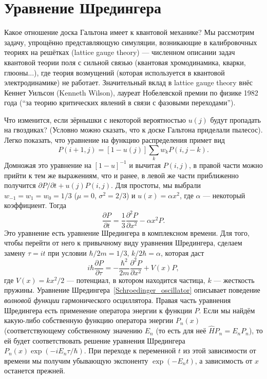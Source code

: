 \documentclass{book}
\begin{document}
\section{Уравнение Шредингера}

Какое отношение доска Гальтона имеет к квантовой механике? Мы рассмотрим задачу, упрощённо
представляющую симуляции, возникающие в калибровочных теориях на решётках (lattice gauge theory) ---
численном описании задач квантовой теории поля с сильной связью (квантовая хромодинамика, кварки,
глюоны...), где теория возмущений (которая используется в квантовой электродинамике) не работает.
Значительный вклад в lattice gauge theory внёс Кеннет Уильсон (Kenneth Wilson), лауреат Нобелевской
премии по физике 1982 года (``за теорию критических явлений в связи с фазовыми переходами'').

Что изменится, если зёрнышки с некоторой вероятностью $u(j)$ будут пропадать на гвоздиках? (Условно
можно сказать, что к доске Гальтона приделали пылесос).  Легко показать, что уравнение на функцию
распределения примет вид
\begin{equation}
    P(i+1, j) = [1 - u(j)]\sum_k w_k P(i, j - k).
\end{equation}
Домножая это уравнение на $[1 - u]^{-1}$ и вычитая $P(i,j)$, в правой части можно прийти к тем же
выражениям, что и ранее, в левой же части приближенно получится $\partial P / \partial t + u(j)
P(i, j)$.
Для простоты, мы выбрали $w_{-1} = w_1 = w_0 = 1/3$ ($\mu = 0$, $\sigma^2 = 2/3$) и 
$u(x) = \alpha x^2$, где $\alpha$ --- некоторый коэффициент. Тогда
\begin{equation}
    \label{Feynman_board}
    \frac{\partial P}{\partial t} = \frac{1}{3} \frac{\partial^2 P}{\partial x^2} - \alpha
    x^2 P.
\end{equation}
Это уравнение есть уравнение Шредингера в комплексном времени. Для того, чтобы перейти от него к
привычному виду уравнения Шредингера, сделаем замену 
$\tau
= i t$ при условии $\hbar / 2 m = 1 / 3$, $k / 2 \hbar = \alpha$,
которая даст
\begin{equation}
    \label{Schroedinger_oscillator}
    i \hbar \frac{\partial P}{\partial \tau} = - \frac{\hbar^2}{2 m} \frac{\partial^2
    P}{\partial x^2} + V(x) P,
\end{equation}
где $V(x) = k x^2 / 2$ --- потенциал, в котором находится частица, $k$ --- жесткость пружины.
Уравнение Шредингера~\ref{Schroedinger_oscillator} описывает поведение \textit{волновой функции}
гармонического осциллятора. Правая часть уравнения Шредингера есть применение оператора энергии к
функции $P$. Если мы найдём какую-либо собственную функцию оператора энергии $P_n(x)$ (соответствующему
собственному значению $E_n$ (то есть для неё $\hat H P_n = E_n P_n$), то ей будет соответствовать
решение уравнения Шредингера $P_n(x) \exp(-i E_n \tau / \hbar)$. При переходе к переменной $t$ из
этой зависимости от времени мы
получим убывающую экспоненту $\exp(- E_n t)$, а зависимость от $x$ останется прежней.
\end{document}
